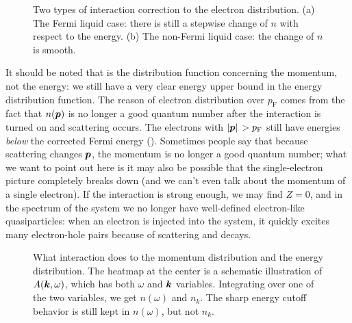 \documentclass[hyperref, a4paper]{article}
\newcommand*{\pfermi}{p_{\text{F}}}
\begin{document}
\begin{figure}
    \centering
    
    \caption{Two types of interaction correction to the electron distribution.
    (a) The Fermi liquid case: there is still a stepwise change of $n$ with respect to the energy.
    (b) The non-Fermi liquid case: the change of $n$ is smooth.}
    \label{fig:fermi-liquid-distribution}
\end{figure}

It should be noted that  
is the distribution function concerning the momentum, not the energy:
we still have a very clear energy upper bound 
in the energy distribution function.
The reason of electron distribution over $\pfermi$
comes from the fact that $n(\vb*{p})$ is no longer a good quantum number 
after the interaction is turned on
and scattering occurs.
The electrons with $\abs*{\vb*{p}} > \pfermi$ 
still have energies \emph{below} the corrected Fermi energy
().
Sometimes people say that because scattering changes $\vb*{p}$, 
the momentum is no longer a good quantum number; 
what we want to point out here 
is it may also be possible 
that the single-electron picture completely breaks down 
(and we can't even talk about the momentum of a single electron).
If the interaction is strong enough, 
we may find $Z = 0$, 
and in the spectrum of the system we no longer have 
well-defined electron-like quasiparticles:
when an electron is injected into the system, 
it quickly excites many electron-hole pairs 
because of scattering
and decays.

\begin{figure}
    \centering
    
    \caption{What interaction does to the momentum distribution and the energy distribution. 
    The heatmap at the center is a schematic illustration of $A(\vb*{k}, \omega)$,
    which has both $\omega$ and $\vb*{k}$ variables. 
    Integrating over one of the two variables,
    we get $n(\omega)$ and $n_k$.
    The sharp energy cutoff behavior is still kept in $n(\omega)$, 
    but not $n_k$.}
    \label{fig:arpes-scheme}
\end{figure}
\end{document}
